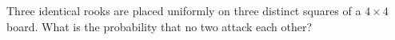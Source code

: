 Three identical rooks are placed uniformly on three distinct squares of a $4\times4$ board. What is the probability that no two attack each other?
